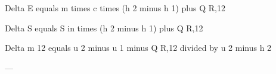 Delta E equals m times c times (h 2 minus h 1) plus Q R,12  

Delta S equals S in times (h 2 minus h 1) plus Q R,12  

Delta m 12 equals u 2 minus u 1 minus Q R,12 divided by u 2 minus h 2  

---